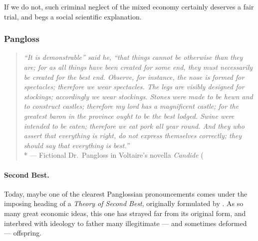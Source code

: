 If we do not, such criminal neglect of the mixed economy certainly deserves a fair trial, and begs a social scientific explanation.


\subsubsection{Pangloss} \label{sec:Pangloss}

\begin{quotation}
	\emph{``It is demonstrable'' said he, ``that things cannot be otherwise than they are;
for as all things have been created for some end, they must necessarily be created for the best end.
	Observe, for instance, the nose is formed for spectacles;
therefore we wear spectacles.
	The legs are visibly designed for stockings;
accordingly we wear stockings.
	Stones were made to be hewn and to construct castles;
therefore my lord has a magnificent castle;
for the greatest baron in the province ought to be the best lodged.
	Swine were intended to be eaten;
therefore we eat pork all year round.
And they who assert that everything is right, do not express themselves correctly;
they should say that everything is best.''}
	\\*
	--- Fictional Dr.\ Pangloss in Voltaire's novella \emph{Candide} (\citeyearpar[loc.~125]{Voltaire1759}
\end{quotation}

\paragraph{Second Best.} Today, maybe one of the clearest Panglossian pronouncements comes under the imposing heading of a \emph{Theory of Second Best}, originally formulated by \cite{Lancaster1956}.
As so many great economic ideas, this one has strayed far from its original form, and interbred with ideology to father many illegitimate --- and sometimes  deformed --- offspring.

